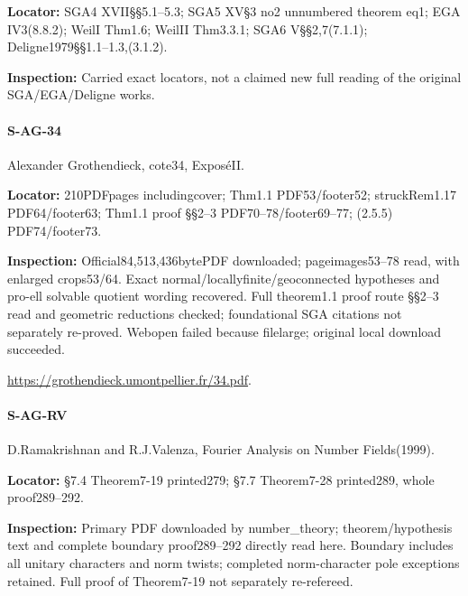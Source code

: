 \documentclass[11pt,a4paper]{article}
\begin{document}
\textbf{Locator:} SGA4 XVII§§5.\allowbreak{}1–\allowbreak{}5.\allowbreak{}3; SGA5 XV§3 no2 unnumbered theorem eq1; EGA IV3(8.\allowbreak{}8.\allowbreak{}2); WeilI Thm1.\allowbreak{}6; WeilII Thm3.\allowbreak{}3.\allowbreak{}1; SGA6 V§§2,7(7.\allowbreak{}1.\allowbreak{}1); Deligne1979§§1.\allowbreak{}1–\allowbreak{}1.\allowbreak{}3,(3.\allowbreak{}1.\allowbreak{}2).

\textbf{Inspection:} Carried exact locators, not a claimed new full reading of the original SGA/\allowbreak{}EGA/\allowbreak{}Deligne works.\allowbreak{}


\paragraph{S-AG-34} Alexander Grothendieck, cote34, ExposéII.

\textbf{Locator:} 210PDFpages includingcover; Thm1.\allowbreak{}1 PDF53/\allowbreak{}footer52; struckRem1.\allowbreak{}17 PDF64/\allowbreak{}footer63; Thm1.\allowbreak{}1 proof §§2–\allowbreak{}3 PDF70–\allowbreak{}78/\allowbreak{}footer69–\allowbreak{}77; (2.\allowbreak{}5.\allowbreak{}5) PDF74/\allowbreak{}footer73.

\textbf{Inspection:} Official84,513,436bytePDF downloaded; pageimages53–\allowbreak{}78 read, with enlarged crops53/\allowbreak{}64.\allowbreak{} Exact normal/\allowbreak{}locallyfinite/\allowbreak{}geoconnected hypotheses and pro-ell solvable quotient wording recovered.\allowbreak{} Full theorem1.\allowbreak{}1 proof route §§2–\allowbreak{}3 read and geometric reductions checked; foundational SGA citations not separately re-proved.\allowbreak{} Webopen failed because filelarge; original local download succeeded.\allowbreak{}

\url{https://grothendieck.umontpellier.fr/34.pdf}.

\paragraph{S-AG-RV} D.\allowbreak{}Ramakrishnan and R.\allowbreak{}J.\allowbreak{}Valenza, Fourier Analysis on Number Fields(1999).

\textbf{Locator:} §7.\allowbreak{}4 Theorem7-19 printed279; §7.\allowbreak{}7 Theorem7-28 printed289, whole proof289–\allowbreak{}292.

\textbf{Inspection:} Primary PDF downloaded by number\_\allowbreak{}theory; theorem/\allowbreak{}hypothesis text and complete boundary proof289–\allowbreak{}292 directly read here.\allowbreak{} Boundary includes all unitary characters and norm twists; completed norm-character pole exceptions retained.\allowbreak{} Full proof of Theorem7-19 not separately re-refereed.\allowbreak{}
\end{document}

